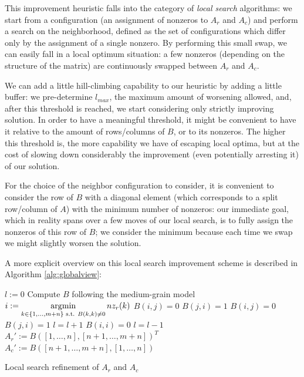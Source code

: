 This improvement heuristic falls into the category of \emph{local search} algorithms: we start from a configuration (an assignment of nonzeros to $A_r$ and $A_c$) and perform a search on the neighborhood, defined as the set of configurations which differ only by the assignment of a single nonzero. By performing this small swap, we can easily fall in a local optimum situation: a few nonzeros (depending on the structure of the matrix) are continuously swapped between $A_r$ and $A_c$. 

We can add a little hill-climbing capability to our heuristic by adding a little buffer: we pre-determine $l_{max}$, the maximum amount of worsening allowed, and, after this threshold is reached, we start considering only strictly improving solution. In order to have a meaningful threshold, it might be convenient to have it relative to the amount of rows/columns of $B$, or to its nonzeros. The higher this threshold is, the more capability we have of escaping local optima, but at the cost of slowing down considerably the improvement (even potentially arresting it) of our solution.

For the choice of the neighbor configuration to consider, it is convenient to consider the row of $B$ with a diagonal element (which corresponds to a split row/column of $A$) with the minimum number of nonzeros: our immediate goal, which in reality spans over a few moves of our local search, is to fully assign the nonzeros of this row of $B$; we consider the minimum because each time we swap we might slightly worsen the solution.

A more explicit overview on this local search improvement scheme is described in Algorithm \ref{alg:globalview}:

\begin{algorithm}[h]
	\begin{algorithmic}
		\State $l := 0$
		\State Compute $B$ following the medium-grain model
		\State $\displaystyle i := \operatorname*{\arg\!\min}_{k \in \{1,\dots,m+n\}\text{ s.t. }B(k,k) \neq 0} nz_r(k)$
		\State $B(i,j) = 0$
		\State $B(j,i) = 1$
		\Else
		\State $B(i,j) = 0$
		\State $B(j,i) = 1$
		\State $l = l+1$
		\EndIf
		\EndIf
		\EndFor
		\State $B(i,i) = 0$
		\State $l = l-1$
		\EndIf
		\EndFor
		\State $A_r' := B([1,\dots,n],[n+1,\dots,m+n])^T$
		\State $A_c' := B([n+1,\dots,m+n],[1,\dots,n])$	
	\end{algorithmic}
	\caption{Local search refinement of $A_r$ and $A_c$} \label{alg:globalview}
\end{algorithm}

